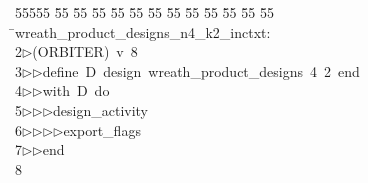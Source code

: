 %
%
\begin{tabbing}
55555 \= 55 \= 55 \= 55 \= 55 \= 55 \= 55 \= 55 \= 55 \= 55 \= 55 \= 55 \= 55 \= \>wreath\_product\_designs\_n4\_k2\_inctxt:\\[0pt]
2\>$\triangleright$\>(ORBITER)\ v\ 8\ \\[0pt]
3\>$\triangleright$\>$\triangleright$\>define\ D\ design\ wreath\_product\_designs\ 4\ 2\ end\ \\[0pt]
4\>$\triangleright$\>$\triangleright$\>with\ D\ do\ \\[0pt]
5\>$\triangleright$\>$\triangleright$\>$\triangleright$\>design\_activity\ \\[0pt]
6\>$\triangleright$\>$\triangleright$\>$\triangleright$\>$\triangleright$\>export\_flags\ \\[0pt]
7\>$\triangleright$\>$\triangleright$\>end\\[0pt]
8\>\end{tabbing}
